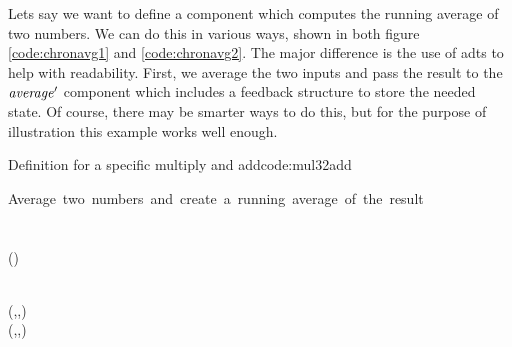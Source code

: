 Lets say we want to define a component which computes the running average of two numbers. 
We can do this in various ways, shown in both figure \ref{code:chronavg1} and \ref{code:chronavg2}.
The major difference is the use of adts  to help with readability.
First, we average the two inputs and pass the result to the \ensuremath{\Varid{average'}} component which includes a feedback structure to store the needed state.
Of course, there may be smarter ways to do this, but for the purpose of illustration this example works well enough.
\begin{texexptitled}{Definition for a specific multiply and add}{code:mul32add}
\begin{hscode}\SaveRestoreHook
{}%
%
%
%
\>[B]{}\mbox{\onelinecomment  Average two numbers and create a running average of the result}{}\<[E]%
\\
\>[B]{}\mathbin{::}\langle{}\rangle\to {}\langle{}\rangle\to {}\langle{}\rangle{}\<[E]%
\\
\>[B]{}\;\;\mathrel{=}{}\<[E]%
\\
\>[B]{}\<[5]%
\>[5]{}\;\mathrel{=}(\mathbin{+})\mathbin{/}\<[E]%
\\
\>[B]{}\<[5]%
\>[5]{}\;{}\<[9]%
\>[9]{}\;\leftarrow{}\langle{}\rangle{}\<[E]%
\ColumnHook
\end{hscode}\resethooks
\begin{hscode}\SaveRestoreHook
{}%
%
%
%
%
%
%
%
\>[B]{}\mathbin{::}{}\<[17]%
\>[17]{}\langle{}\rangle{}\<[E]%
\\
\>[17]{}\to (\langle{}\mathbin{-}\rangle,\langle{}\mathbin{-}\rangle,\langle{}\mathbin{-}\rangle)\to {}\<[E]%
\\
\>[17]{}(\langle{}\rangle,\langle{}\rangle,\langle{}\rangle){}\<[E]%

\end{hscode}
\end{texexptitled}
